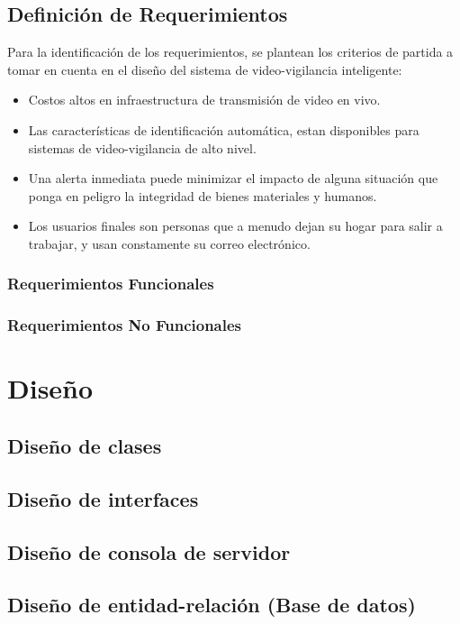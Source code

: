 \subsection{Definición de Requerimientos}
Para la identificación de los requerimientos, se plantean los criterios de partida a tomar en cuenta en el diseño del sistema de video-vigilancia inteligente:
\begin{itemize}
    \item Costos altos en infraestructura de transmisión de video en vivo.
    \item Las características de identificación automática, estan disponibles para sistemas de video-vigilancia de alto nivel.
    \item Una alerta inmediata puede minimizar el impacto de alguna situación que ponga en peligro la integridad de bienes materiales y humanos.
    \item Los usuarios finales son personas que a menudo dejan su hogar para salir a trabajar, y usan constamente su correo electrónico.
\end{itemize}


\subsubsection{Requerimientos Funcionales}

\subsubsection{Requerimientos No Funcionales}

\section{Diseño}

\subsection{Diseño de clases}

\subsection{Diseño de interfaces}

\subsection{Diseño de consola de servidor}

\subsection{Diseño de entidad-relación (Base de datos)}

